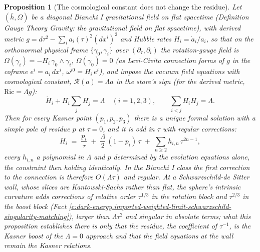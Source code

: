 \documentclass[11pt]{article}
\newtheorem{proposition}[theorem]{Proposition}
\theoremstyle{definition}
\theoremstyle{plain}
\newcommand{\changedmark}[2]{\marginpar{\raggedright\scriptsize\color{#1}#2}}
\providecommand{\hb}{}\renewcommand{\hb}{\bar{h}}
\begin{document}
\begin{proposition}[The cosmological constant does not change the residue]\label{c:dark-energy.cosmological-constant-does-not-change-residue}
\changedmark{BurntOrange}{changed since the deposit}
Let $(\hb, \Omega)$ be a diagonal Bianchi I gravitational field on flat spacetime (Definition \emph{Gauge Theory Gravity: the gravitational field on flat spacetime}), with derived metric $g = d\tau^2 - \sum_i a_i(\tau)^2(dx^i)^2$ and Hubble rates $H_i = \dot a_i/a_i$, so that on the orthonormal physical frame $\{\gamma_0, \gamma_i\}$ over $(\partial_\tau, \partial_i)$ the rotation-gauge field is $\Omega(\gamma_i) = -H_i\,\gamma_0 \wedge \gamma_i$, $\Omega(\gamma_0) = 0$ (as Levi-Civita connection forms of $g$ in the coframe $e^i = a_i\,dx^i$, $\omega^{i0} = H_i\,e^i$), and impose the vacuum field equations with cosmological constant, $\mathcal{R}(a) = \Lambda a$ in the store's sign (for the derived metric, $\mathrm{Ric} = \Lambda g$):
\[
\dot H_i + H_i\sum_j H_j = \Lambda \quad (i = 1,2,3), \qquad \sum_{i<j}H_iH_j = \Lambda .
\]
Then for every Kasner point $(p_1, p_2, p_3)$ there is a unique formal solution with a simple pole of residue $p$ at $\tau = 0$, and it is odd in $\tau$ with regular corrections:
\[
H_i \;=\; \frac{p_i}{\tau} \;+\; \frac{\Lambda}{2}\,(1 - p_i)\,\tau \;+\; \sum_{n \geq 2} h_{i,n}\,\tau^{2n-1},
\]
every $h_{i,n}$ a polynomial in $\Lambda$ and $p$ determined by the evolution equations alone, the constraint then holding identically. In the Bianchi I class the first correction to the connection is therefore $O(\Lambda\tau)$ and regular. At a Schwarzschild-de Sitter wall, whose slices are Kantowski-Sachs rather than flat, the sphere's intrinsic curvature adds corrections of relative order $\tau^{1/3}$ in the rotation block and $\tau^{2/3}$ in the boost block (Fact \ref{c:dark-energy.imported-weighted-limit-schwarzschild-singularity-matching}), larger than $\Lambda\tau^2$ and singular in absolute terms; what this proposition establishes there is only that the residue, the coefficient of $\tau^{-1}$, is the Kasner boost of the $\Lambda = 0$ approach and that the field equations at the wall remain the Kasner relations.
\end{proposition}
\end{document}
